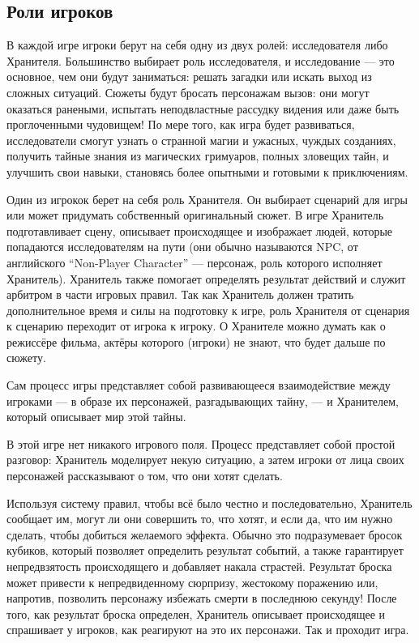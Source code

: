 \documentclass[letterpaper,twocolumn,openany, twoside, 11pt, usenames]{cocbook}
\begin{document}
\subsection*{\nohyphens{Роли игроков}}

В каждой игре игроки берут на себя одну из двух ролей: исследователя либо Хранителя. Большинство выбирает роль исследователя, и исследование --- это основное, чем они будут заниматься: решать загадки или искать выход из сложных ситуаций. Сюжеты будут бросать персонажам вызов: они могут оказаться ранеными, испытать неподвластные рассудку видения или даже быть проглоченными чудовищем! По мере того, как игра будет развиваться, исследователи смогут узнать о странной магии и ужасных, чуждых созданиях, получить тайные знания из магических гримуаров, полных зловещих тайн, и улучшить свои навыки, становясь более опытными и готовыми к приключениям.

Один из игрокок берет на себя роль Хранителя. Он выбирает сценарий для игры или может придумать собственный оригинальный сюжет. В игре Хранитель подготавливает сцену, описывает происходящее и изображает людей, которые попадаются исследователям на пути (они обычно называются NPC, от английского ``Non-Player Character'' --- персонаж, роль которого исполняет Хранитель). Хранитель также помогает определять результат действий и служит арбитром в части игровых правил. Так как Хранитель должен тратить дополнительное время и силы на подготовку к игре, роль Хранителя от сценария к сценарию переходит от игрока к игроку. О Хранителе можно думать как о режиссёре фильма, актёры которого (игроки) не знают, что будет дальше по сюжету.

Сам процесс игры представляет собой развивающееся взаимодействие между игроками --- в образе их персонажей, разгадывающих тайну, --- и Хранителем, который описывает мир этой тайны.

В этой игре нет никакого игрового поля. Процесс представляет собой простой разговор: Хранитель моделирует некую ситуацию, а затем игроки от лица своих персонажей рассказывают о том, что они хотят сделать.

Используя систему правил, чтобы всё было честно и последовательно, Хранитель сообщает им, могут ли они совершить то, что хотят, и если да, что им нужно сделать, чтобы добиться желаемого эффекта. Обычно это подразумевает бросок кубиков, который позволяет определить результат событий, а также гарантирует непредвзятость происходящего и добавляет накала страстей. Результат броска может привести к непредвиденному сюрпризу, жестокому поражению или, напротив, позволить персонажу избежать смерти в последнюю секунду! После того, как результат броска определен, Хранитель описывает происходящее и спрашивает у игроков, как реагируют на это их персонажи. Так и проходит игра.
\end{document}
